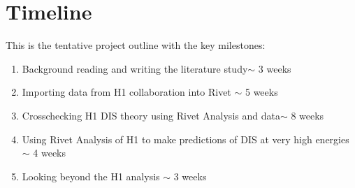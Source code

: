 \documentclass[journal, a4paper,10pt]{IEEEtran}
\begin{document}
\section{Timeline}
\noindent This is the tentative project outline with the key milestones:
\begin{enumerate}
	\item Background reading and writing the literature study$\sim$ 3 weeks

	\item Importing data from H1 collaboration into Rivet $\sim$ 5 weeks

	\item Crosschecking H1 DIS theory using Rivet Analysis and data$\sim$ 8 weeks

	\item Using Rivet Analysis of H1 to make predictions of DIS at very high energies $\sim$ 4 weeks 

	\item Looking beyond the H1 analysis $\sim$ 3 weeks
\end{enumerate}



\end{document}
